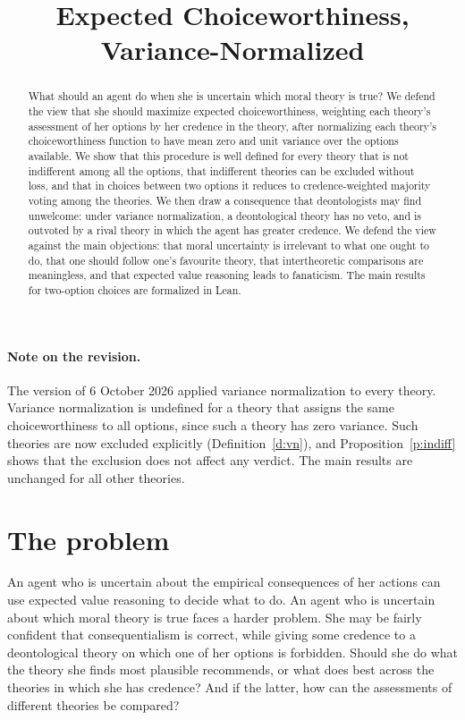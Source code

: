\documentclass{situationist-preprint}
\title{Expected Choiceworthiness, Variance-Normalized}
\begin{document}
\maketitle

\begin{abstract}
What should an agent do when she is uncertain which moral theory is true? We defend the view that she should maximize expected choiceworthiness, weighting each theory's assessment of her options by her credence in the theory, after normalizing each theory's choiceworthiness function to have mean zero and unit variance over the options available. We show that this procedure is well defined for every theory that is not indifferent among all the options, that indifferent theories can be excluded without loss, and that in choices between two options it reduces to credence-weighted majority voting among the theories. We then draw a consequence that deontologists may find unwelcome: under variance normalization, a deontological theory has no veto, and is outvoted by a rival theory in which the agent has greater credence. We defend the view against the main objections: that moral uncertainty is irrelevant to what one ought to do, that one should follow one's favourite theory, that intertheoretic comparisons are meaningless, and that expected value reasoning leads to fanaticism. The main results for two-option choices are formalized in Lean.
\end{abstract}

\paragraph{Note on the revision.} The version of 6 October 2026 applied variance normalization to every theory. Variance normalization is undefined for a theory that assigns the same choiceworthiness to all options, since such a theory has zero variance. Such theories are now excluded explicitly (Definition~\ref{d:vn}), and Proposition~\ref{p:indiff} shows that the exclusion does not affect any verdict. The main results are unchanged for all other theories.

\section{The problem}

An agent who is uncertain about the empirical consequences of her actions can use expected value reasoning to decide what to do. An agent who is uncertain about which moral theory is true faces a harder problem. She may be fairly confident that consequentialism is correct, while giving some credence to a deontological theory on which one of her options is forbidden. Should she do what the theory she finds most plausible recommends, or what does best across the theories in which she has credence? And if the latter, how can the assessments of different theories be compared?
\end{document}
